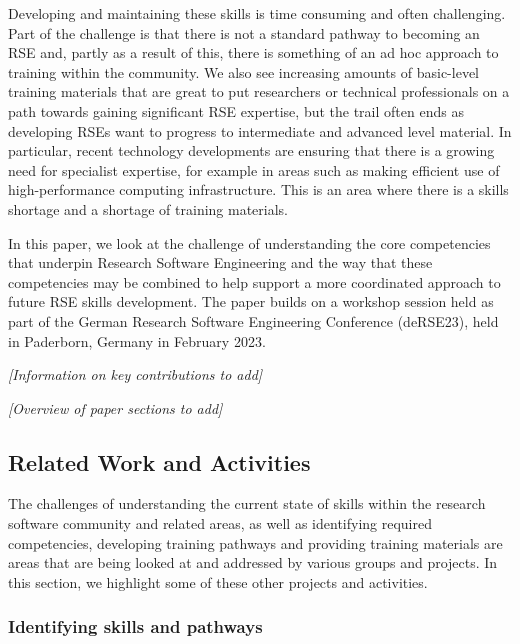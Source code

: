 \documentclass[a4paper
]{article}
\begin{document}
Developing and maintaining these skills is time consuming and often
challenging. Part of the challenge is that there is not a standard
pathway to becoming an RSE and, partly as a result of this, there is
something of an ad hoc approach to training within the community. We
also see increasing amounts of basic-level training materials that are
great to put researchers or technical professionals on a path towards
gaining significant RSE expertise, but the trail often ends as
developing RSEs want to progress to intermediate and advanced level
material. In particular, recent technology developments are ensuring
that there is a growing need for specialist expertise, for example in
areas such as making efficient use of high-performance computing
infrastructure. This is an area where there is a skills shortage and a
shortage of training materials.

In this paper, we look at the challenge of understanding the core
competencies that underpin Research Software Engineering and the way
that these competencies may be combined to help support a more
coordinated approach to future RSE skills development. The paper builds
on a workshop session held as part of the German Research Software
Engineering Conference (deRSE23), held in Paderborn, Germany in February
2023.

\emph{{[}Information on key contributions to add{]}}

\emph{{[}Overview of paper sections to add{]}}

\hypertarget{related-work-and-activities}{%
\subsection{Related Work and
Activities}\label{related-work-and-activities}}

The challenges of understanding the current state of skills within the
research software community and related areas, as well as identifying
required competencies, developing training pathways and providing
training materials are areas that are being looked at and addressed by
various groups and projects. In this section, we highlight some of these
other projects and activities.

\hypertarget{identifying-skills-and-pathways}{%
\subsubsection{Identifying skills and
pathways}\label{identifying-skills-and-pathways}}
\end{document}
